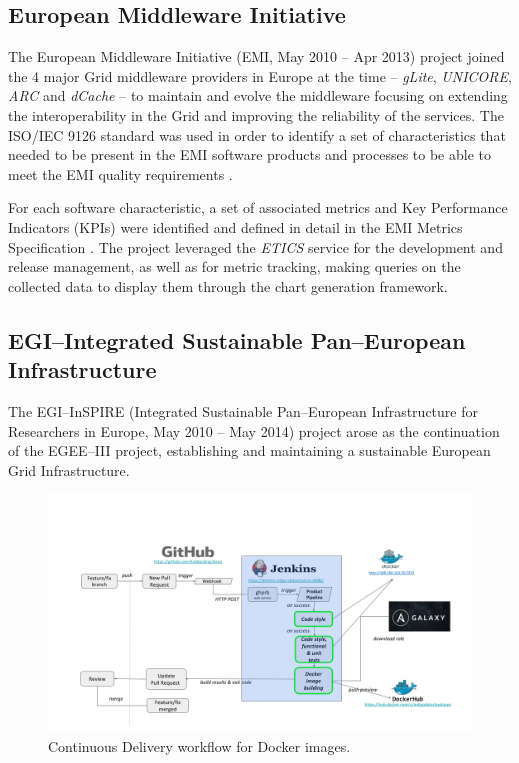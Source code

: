 \documentclass[journal]{IEEEtran}
\begin{document}
\subsection{European Middleware Initiative}

The European Middleware Initiative (EMI, May 2010 -- Apr 2013)
\cite{cordis:emi} project joined the 4 major Grid middleware providers in
Europe at the time -- {\sl gLite}, {\sl UNICORE}, {\sl ARC} and {\sl dCache} --
to maintain and evolve the middleware focusing on extending the
interoperability in the Grid and improving the reliability of the services. The
ISO/IEC 9126 \cite{iso-9126} standard was used in order to identify a set of
characteristics that needed to be present in the EMI software products and
processes to be able to meet the EMI quality requirements
\cite{emi-quality-model}.

For each software characteristic, a set of associated
metrics and Key Performance Indicators (KPIs) were identified and defined in
detail in the EMI Metrics Specification \cite{emi-metrics}. The project
leveraged the {\sl ETICS} service for the development and release management,
as well as for metric tracking, making queries on the collected data to display
them through the chart generation framework.

\subsection{EGI--Integrated Sustainable Pan--European Infrastructure}


The EGI--InSPIRE (Integrated Sustainable Pan--European Infrastructure for
Researchers in Europe, May 2010 -- May 2014) project \cite{cordis:egi-inspire}
arose as the continuation of the EGEE--III project, establishing and
maintaining a sustainable European Grid Infrastructure.

\begin{figure}[ht]
\centering
\includegraphics[width=\textwidth]{images/devops.png}
\caption{Continuous Delivery workflow for Docker images.}
\label{fig:fig_CD}
\end{figure}
\end{document}
